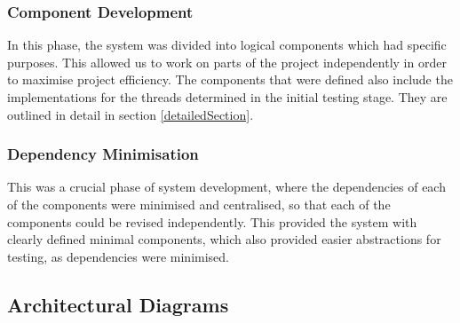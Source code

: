 \subsubsection{Component Development}
In this phase, the system was divided into logical components which had specific purposes. This allowed us to work on parts of the project independently in order to maximise project efficiency. The components that were defined also include the implementations for the threads determined in the initial testing stage. They are outlined in detail in section \ref{detailedSection}.

\subsubsection{Dependency Minimisation}
This was a crucial phase of system development, where the dependencies of each of the components were minimised and centralised, so that each of the components could be revised independently. This provided the system with clearly defined minimal components, which also provided easier abstractions for testing, as dependencies were minimised.

\subsection{Architectural Diagrams}
